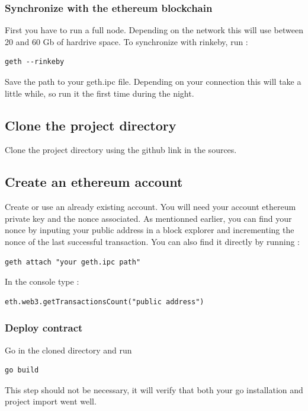 \documentclass[11pt, a4paper, twoside, openright]{book} %
\begin{document}
\subsubsection*{Synchronize with the ethereum blockchain}
First you have to run a full node. Depending on the network this will use between 20 and 60 Gb of hardrive space. To synchronize with rinkeby, run :
\begin{lstlisting}
geth --rinkeby
\end{lstlisting}
Save the path to your geth.ipc file. 
Depending on your connection this will take a little while, so run it the first time during the night.
\subsection*{Clone the project directory}
Clone the project directory using the github link in the sources. 
\subsection*{Create an ethereum account}
Create or use an already existing account. You will need your account ethereum private key and the nonce associated. As mentionned earlier, you can find your nonce by inputing your public address in a block explorer and incrementing the nonce of the last successful transaction. You can also find it directly by running : \\
\begin{lstlisting}
geth attach "your geth.ipc path"
\end{lstlisting}  
In the console type : 
\begin{lstlisting}
eth.web3.getTransactionsCount("public address")
\end{lstlisting}
\subsubsection*{Deploy contract}
Go in the cloned directory and run
\begin{lstlisting}
go build
\end{lstlisting}
This step should not be necessary, it will verify that both your go installation and project import went well.\\\\
\end{document}
